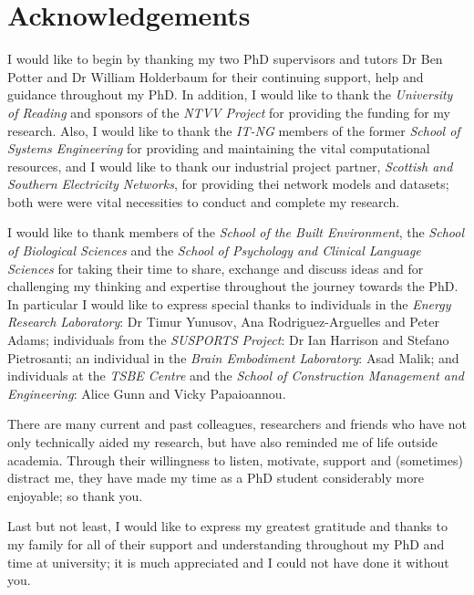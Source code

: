\chapter*{Acknowledgements}

I would like to begin by thanking my two PhD supervisors and tutors Dr Ben Potter and Dr William Holderbaum for their continuing support, help and guidance throughout my PhD.
In addition, I would like to thank the \textit{University of Reading} and sponsors of the \textit{NTVV Project} for providing the funding for my research.
Also, I would like to thank the \textit{IT-NG} members of the former \textit{School of Systems Engineering} for providing and maintaining the vital computational resources, and I would like to thank our industrial project partner, \textit{Scottish and Southern Electricity Networks}, for providing thei network models and datasets; both were were vital necessities to conduct and complete my research.

I would like to thank members of the \textit{School of the Built Environment}, the \textit{School of Biological Sciences} and the \textit{School of Psychology and Clinical Language Sciences} for taking their time to share, exchange and discuss ideas and for challenging my thinking and expertise throughout the journey towards the PhD.
In particular I would like to express special thanks to individuals in the \textit{Energy Research Laboratory}: Dr Timur Yunusov, Ana Rodriguez-Arguelles and Peter Adams; individuals from the \textit{SUSPORTS Project}: Dr Ian Harrison and Stefano Pietrosanti; an individual in the \textit{Brain Embodiment Laboratory}: Asad Malik; and individuals at the \textit{TSBE Centre} and the \textit{School of Construction Management and Engineering}: Alice Gunn and Vicky Papaioannou.

There are many current and past colleagues, researchers and friends who have not only technically aided my research, but have also reminded me of life outside academia.
Through their willingness to listen, motivate, support and (sometimes) distract me, they have made my time as a PhD student considerably more enjoyable; so thank you.


Last but not least, I would like to express my greatest gratitude and thanks to my family for all of their support and understanding throughout my PhD and time at university; it is much appreciated and I could not have done it without you.
